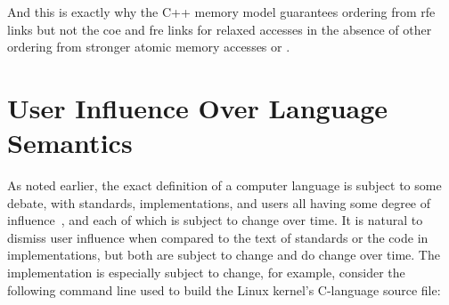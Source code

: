 \documentclass[10]{article}
\begin{document}
And this is exactly why the C++ memory model guarantees ordering from
rfe links but not the coe and fre links for relaxed accesses in the
absence of other ordering from stronger atomic memory accesses or
.

\clearpage

\section{User Influence Over Language Semantics}
\label{sec:User Influence Over Language Semantics}

As noted earlier, the exact definition of a computer language is subject
to some debate, with standards, implementations, and users all having
some degree of
influence~\cite{KayvanMemarian2016DepthOfC-1,KayvanMemarian2016DepthOfC-2},
and each of which is subject to change over time.
It is natural to dismiss user influence when compared to the text of
standards or the code in implementations, but both are subject to
change and do change over time.
The implementation is especially subject to change, for example,
consider the following command line used to build the Linux kernel's
 C-language source file:
\end{document}
